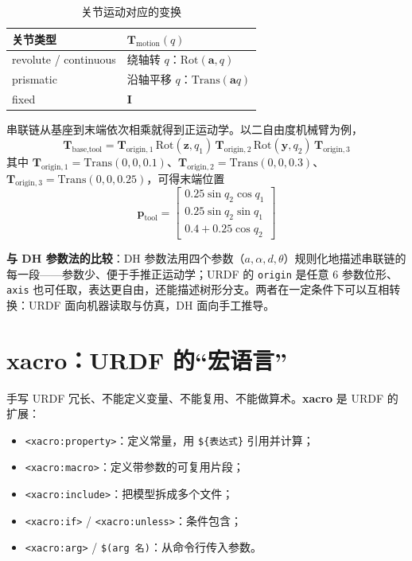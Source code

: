 \begin{table}[H]
	\centering
	\caption{关节运动对应的变换}
	\label{tab:URDF:关节变换}
	\begin{tabular}{ll}
		\hline
		关节类型 & $\boldsymbol{T}_{\text{motion}}(q)$ \\
		\hline
		revolute / continuous & 绕轴转 $q$：$\mathrm{Rot}(\boldsymbol{a},q)$ \\
		prismatic & 沿轴平移 $q$：$\mathrm{Trans}(\boldsymbol{a}q)$ \\
		fixed & $\boldsymbol{I}$ \\
		\hline
	\end{tabular}
\end{table}

串联链从基座到末端依次相乘就得到正运动学。以二自由度机械臂为例，
\begin{equation}
	\label{eq:URDF:2R正运动学}
	\boldsymbol{T}_{\text{base,tool}}
	=\boldsymbol{T}_{\text{origin},1}\,\mathrm{Rot}(\boldsymbol{z},q_{1})\,
	\boldsymbol{T}_{\text{origin},2}\,\mathrm{Rot}(\boldsymbol{y},q_{2})\,
	\boldsymbol{T}_{\text{origin},3}
\end{equation}
其中 $\boldsymbol{T}_{\text{origin},1}=\mathrm{Trans}(0,0,0.1)$、$\boldsymbol{T}_{\text{origin},2}=\mathrm{Trans}(0,0,0.3)$、$\boldsymbol{T}_{\text{origin},3}=\mathrm{Trans}(0,0,0.25)$，可得末端位置
\begin{equation}
	\label{eq:URDF:2R末端位置}
	\boldsymbol{p}_{\text{tool}}=\begin{bmatrix}
		0.25\sin q_{2}\cos q_{1}\\
		0.25\sin q_{2}\sin q_{1}\\
		0.4+0.25\cos q_{2}
	\end{bmatrix}
\end{equation}

\textbf{与 DH 参数法的比较}：DH 参数法用四个参数（$a,\alpha,d,\theta$）规则化地描述串联链的每一段——参数少、便于手推正运动学；URDF 的 \texttt{origin} 是任意 6 参数位形、\texttt{axis} 也可任取，表达更自由，还能描述树形分支。两者在一定条件下可以互相转换：URDF 面向机器读取与仿真，DH 面向手工推导。

\section{xacro：URDF 的“宏语言”}

手写 URDF 冗长、不能定义变量、不能复用、不能做算术。\textbf{xacro} 是 URDF 的扩展：
\begin{itemize}
	\item \texttt{<xacro:property>}：定义常量，用 \texttt{\$\{表达式\}} 引用并计算；
	\item \texttt{<xacro:macro>}：定义带参数的可复用片段；
	\item \texttt{<xacro:include>}：把模型拆成多个文件；
	\item \texttt{<xacro:if>} / \texttt{<xacro:unless>}：条件包含；
	\item \texttt{<xacro:arg>} / \texttt{\$(arg 名)}：从命令行传入参数。
\end{itemize}

